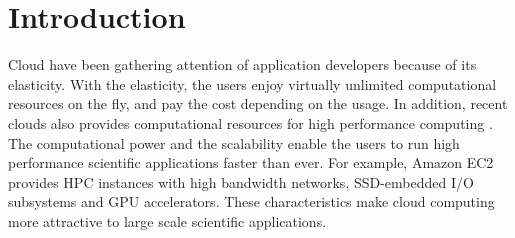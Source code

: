 \section{Introduction}
\label{sec:introduction}
Cloud have been gathering attention of application developers because
of its elasticity. With the elasticity, the users enjoy virtually unlimited
computational resources on the fly, and pay the cost depending on the usage.
In addition, recent clouds also provides computational resources for high
performance computing
\cite{AMAZON_AWS,Azure,IBM_public_cloud,oracle_cloud,hp_cloud}.
The computational power and the scalability enable the users to run high
performance scientific applications faster than ever.
For example, Amazon EC2 provides HPC instances with high bandwidth networks,
SSD-embedded I/O subsystems and GPU accelerators\cite{AWS_HPC}.
These characteristics make cloud computing more attractive to large scale
scientific applications.
\par
